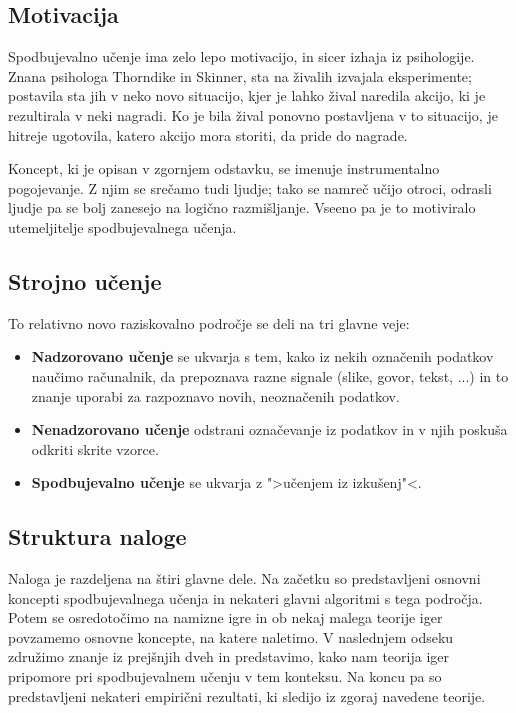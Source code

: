 \documentclass[12pt,a4paper]{amsart}
\theoremstyle{definition} %
\theoremstyle{plain} %
\begin{document}
\subsection{Motivacija}
Spodbujevalno učenje ima zelo lepo motivacijo, in sicer izhaja iz psihologije. Znana psihologa 
Thorndike in Skinner, sta na živalih izvajala eksperimente; postavila sta jih v neko novo 
situacijo, kjer je lahko žival naredila akcijo, ki je rezultirala v neki nagradi. Ko je bila
žival ponovno postavljena v to situacijo, je hitreje ugotovila, katero akcijo mora storiti, da
pride do nagrade.

Koncept, ki je opisan v zgornjem odstavku, se imenuje instrumentalno pogojevanje. Z njim se 
srečamo tudi ljudje; tako se namreč učijo otroci, odrasli ljudje pa se bolj zanesejo na 
logično razmišljanje. Vseeno pa je to motiviralo utemeljitelje spodbujevalnega učenja.

\subsection{Strojno učenje}
To relativno novo raziskovalno področje se deli na tri glavne veje:
\begin{itemize}
    \item \textbf{Nadzorovano učenje} se ukvarja s tem, kako iz nekih označenih podatkov 
            naučimo računalnik, da prepoznava razne signale (slike, govor, tekst, ...)
            in to znanje uporabi za razpoznavo novih, neoznačenih podatkov.
    \item \textbf{Nenadzorovano učenje} odstrani označevanje iz podatkov in v njih poskuša 
            odkriti skrite vzorce.
    \item \textbf{Spodbujevalno učenje} se ukvarja z ">učenjem iz izkušenj"<.
\end{itemize}

\subsection{Struktura naloge}
Naloga je razdeljena na štiri glavne dele. Na začetku so predstavljeni osnovni koncepti 
spodbujevalnega učenja in nekateri glavni algoritmi s tega področja. Potem se osredotočimo na 
namizne igre in ob nekaj malega teorije iger povzamemo osnovne koncepte, na katere naletimo. 
V naslednjem odseku združimo znanje iz prejšnjih dveh in predstavimo, kako nam teorija iger 
pripomore pri spodbujevalnem učenju v tem konteksu. Na koncu pa so predstavljeni nekateri empirični
rezultati, ki sledijo iz zgoraj navedene teorije.
\end{document}
